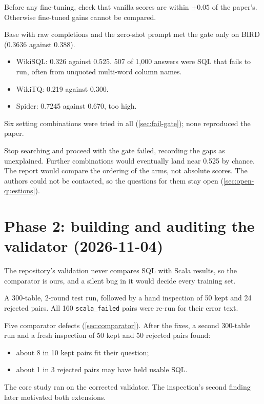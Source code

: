 \begin{description}[style=nextline,leftmargin=1.2em]
\item[Motivation.] Before any fine-tuning, check that vanilla scores are within $\pm0.05$ of the paper's. Otherwise
fine-tuned gains cannot be compared.
\item[Result.] Base with raw completions and the zero-shot prompt met the gate only on BIRD (0.3636 against 0.388).
  \begin{itemize}
  \item WikiSQL: 0.326 against 0.525. 507 of 1,000 answers were SQL that fails to run, often from unquoted multi-word
  column names.
  \item WikiTQ: 0.219 against 0.300.
  \item Spider: 0.7245 against 0.670, too high.
  \end{itemize}
Six setting combinations were tried in all (\cref{sec:fail-gate}); none reproduced the paper.
\item[Decision.] Stop searching and proceed with the gate failed, recording the gaps as unexplained. Further
combinations would eventually land near 0.525 by chance. The report would compare the ordering of the arms, not
absolute scores. The authors could not be contacted, so the questions for them stay open (\cref{sec:open-questions}).
\end{description}

\section{Phase 2: building and auditing the validator (2026-11-04)}\label{sec:hist-validator}

\begin{description}[style=nextline,leftmargin=1.2em]
\item[Motivation.] The repository's validation never compares SQL with Scala results, so the comparator is ours, and a
silent bug in it would decide every training set.
\item[Action.] A 300-table, 2-round test run, followed by a hand inspection of 50 kept and 24 rejected pairs. All 160
\texttt{scala\_failed} pairs were re-run for their error text.
\item[Findings.] Five comparator defects (\cref{sec:comparator}). After the fixes, a second 300-table run and a fresh
inspection of 50 kept and 50 rejected pairs found:
  \begin{itemize}
  \item about 8 in 10 kept pairs fit their question;
  \item about 1 in 3 rejected pairs may have held usable SQL.
  \end{itemize}
\item[Consequence.] The core study ran on the corrected validator. The inspection's second finding later motivated
both extensions.
\end{description}

